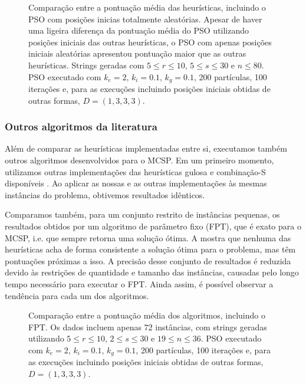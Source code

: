         \begin{figure}[htb]
            \centering
            \caption{Comparação entre a pontuação média das heurísticas, incluindo o PSO com posições inicias totalmente aleatórias. Apesar de haver uma ligeira diferença da pontuação média do PSO utilizando posições iniciais das outras heurísticas, o PSO com apenas posições iniciais aleatórias apresentou pontuação maior que as outras heurísticas. Strings geradas com $5 \leq r \leq 10$, $5 \leq s \leq 30$ e $n \leq 80$. PSO executado com $k_e = 2$, $k_i = 0.1$, $k_g = 0.1$, 200 partículas, 100 iterações e, para as execuções incluindo posições iniciais obtidas de outras formas, $D = (1, 3, 3, 3)$.}
            \label{fig:pso-puro}
        \end{figure}

    \subsubsection{Outros algoritmos da literatura}

        Além de comparar as heurísticas implementadas entre si, executamos também outros algoritmos desenvolvidos para o MCSP. Em um primeiro momento, utilizamos outras implementações das heurísticas gulosa e combinação-S disponíveis \cite{siqueira_signed_2023}. Ao aplicar as nossas e as outras implementações às mesmas instâncias do problema, obtivemos resultados idênticos.

        Comparamos também, para um conjunto restrito de instâncias pequenas, os resultados obtidos por um algoritmo de parâmetro fixo (FPT), que é exato para o MCSP, i.e. que sempre retorna uma solução ótima. A  mostra que nenhuma das heurísticas acha de forma consistente a solução ótima para o problema, mas têm pontuações próximas a isso. A precisão desse conjunto de resultados é reduzida devido às restrições de quantidade e tamanho das instâncias, causadas pelo longo tempo necessário para executar o FPT. Ainda assim, é possível observar a tendência para cada um dos algoritmos.

        \begin{figure}[htb]
            \centering
            \caption{Comparação entre a pontuação média dos algoritmos, incluindo o FPT. Os dados incluem apenas 72 instâncias, com strings geradas utilizando $5 \leq r \leq 10$, $2 \leq s \leq 30$ e $19 \leq n \leq 36$. PSO executado com $k_e = 2$, $k_i = 0.1$, $k_g = 0.1$, 200 partículas, 100 iterações e, para as execuções incluindo posições iniciais obtidas de outras formas, $D = (1, 3, 3, 3)$.}
            \label{fig:fpt}
        \end{figure}
